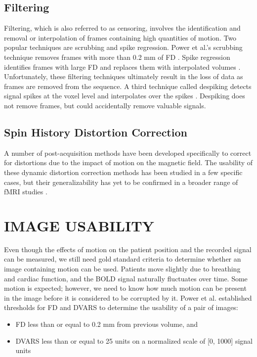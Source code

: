 \subsection{Filtering}

Filtering, which is also referred to as censoring, involves the identification and removal or interpolation of frames containing high quantities of motion. Two popular techniques are scrubbing and spike regression. Power et al.’s scrubbing technique removes frames with more than 0.2 mm of FD \cite{Power2012}. Spike regression identifies frames with large FD and replaces them with interpolated volumes \cite{Satterthwaite2013}. Unfortunately, these filtering techniques ultimately result in the loss of data as frames are removed from the sequence. A third technique called despiking detects signal spikes at the voxel level and interpolates over the spikes \cite{Jo2013} \cite{Patel2014}. Despiking does not remove frames, but could accidentally remove valuable signals. 

\subsection{Spin History Distortion Correction}

A number of post-acquisition methods have been developed specifically to correct for distortions due to the impact of motion on the magnetic field. The usability of these dynamic distortion correction methods has been studied in a few specific cases, but their generalizability has yet to be confirmed in a broader range of fMRI studies \cite{Zaitsev2017}.

\section{IMAGE USABILITY}



Even though the effects of motion on the patient position and the recorded signal can be measured, we still need gold standard criteria to determine whether an image containing motion can be used. Patients move slightly due to breathing and cardiac function, and the BOLD signal naturally fluctuates over time. Some motion is expected; however, we need to know how much motion can be present in the image before it is considered to be corrupted by it. Power et al. established thresholds for FD and DVARS to determine the usability of a pair of images:
\begin{itemize}
\item FD less than or equal to 0.2 mm from previous volume, and
\item DVARS less than or equal to 25 units on a normalized scale of [0, 1000] signal units \cite{Power2014}
\end{itemize}

